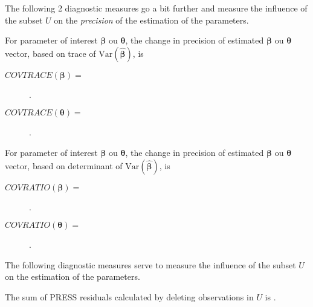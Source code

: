 \documentclass[english]{article}
\begin{document}
\begin{multicols*}{2}
\bigskip

The following 2 diagnostic measures go a bit further and measure the influence of the subset $U$ on the \textit{precision} of the estimation of the parameters.

\begin{definitionNOHFILLsub}
For parameter of interest $\bm{\beta}$ ou $\bm{\theta}$, the change in precision of estimated $\bm{\beta}$ ou $\bm{\theta}$ vector, based on trace of $\text{Var}(\hat{\bm{\beta}})$, is
\begin{description}
	\item[$COVTRACE(\bm{\beta}) =$]	.
	\item[$COVTRACE(\bm{\theta}) =$]	.
\end{description}
\end{definitionNOHFILLsub}

\begin{definitionNOHFILLsub}
For parameter of interest $\bm{\beta}$ ou $\bm{\theta}$, the change in precision of estimated $\bm{\beta}$ ou $\bm{\theta}$ vector, based on determinant of $\text{Var}(\hat{\bm{\beta}})$, is
\begin{description}
	\item[$COV RATIO(\bm{\beta}) =$]	.
	\item[$COV RATIO(\bm{\theta}) =$]		.
\end{description}
\end{definitionNOHFILLsub}

\bigskip

The following diagnostic measures serve to measure the influence of the subset $U$ on the estimation of the parameters.

\begin{definitionNOHFILLsub}
The sum of PRESS residuals calculated by deleting observations in $U$ is .
\end{definitionNOHFILLsub}



\end{multicols*}
\end{document}

